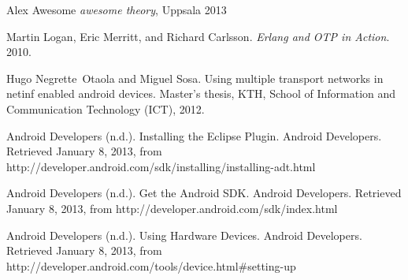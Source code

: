 \documentclass[11pt]{report}
\begin{document}
\begin{thebibliography}{99}

 Alex Awesome \textsl{awesome theory}, Uppsala 2013

 Martin Logan, Eric Merritt, and Richard Carlsson. \textsl{Erlang and OTP in Action}. 2010.

Hugo Negrette~Otaola and Miguel Sosa.
\newblock Using multiple transport networks in netinf enabled android devices.
\newblock Master's thesis, KTH, School of Information and Communication
  Technology (ICT), 2012.

 Android Developers (n.d.). Installing the Eclipse Plugin. Android Developers. Retrieved January 8, 2013, from http://developer.android.com/sdk/installing/installing-adt.html

 Android Developers (n.d.). Get the Android SDK. Android Developers. Retrieved January 8, 2013, from http://developer.android.com/sdk/index.html

 Android Developers (n.d.). Using Hardware Devices. Android Developers. Retrieved January 8, 2013, from http://developer.android.com/tools/device.html\#setting-up

\end{thebibliography}
\end{document}
